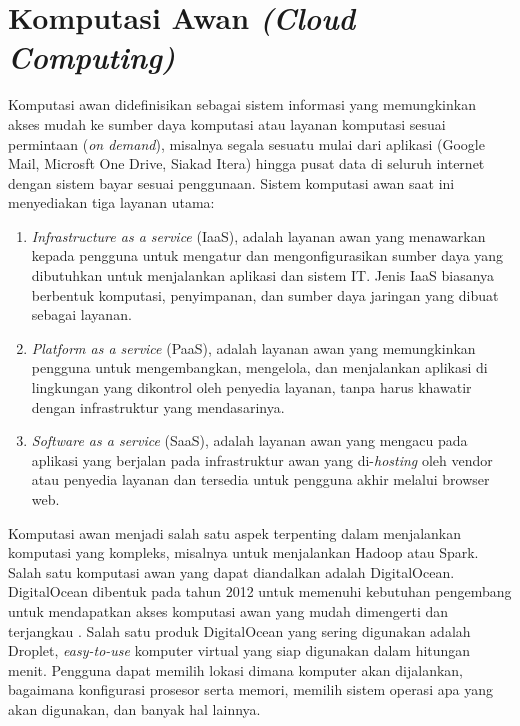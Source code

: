 \section{Komputasi Awan \textit{(Cloud Computing)}}
Komputasi awan didefinisikan sebagai sistem informasi yang memungkinkan akses mudah ke sumber daya komputasi atau layanan komputasi sesuai permintaan (\textit{on demand}), misalnya segala sesuatu mulai dari aplikasi (Google Mail, Microsft One Drive, Siakad Itera) hingga pusat data di seluruh internet dengan sistem bayar sesuai penggunaan.
Sistem komputasi awan saat ini menyediakan tiga layanan utama:
\begin{enumerate}
	\item \textit{Infrastructure as a service} (IaaS), adalah layanan awan yang menawarkan kepada pengguna untuk mengatur dan mengonfigurasikan sumber daya yang dibutuhkan untuk menjalankan aplikasi dan sistem IT. Jenis IaaS biasanya berbentuk komputasi, penyimpanan, dan sumber daya jaringan yang dibuat sebagai layanan.
	\item \textit{Platform as a service} (PaaS), adalah layanan awan yang memungkinkan pengguna untuk mengembangkan, mengelola, dan menjalankan aplikasi di lingkungan yang dikontrol oleh penyedia layanan, tanpa harus khawatir dengan infrastruktur yang mendasarinya. 
	\item \textit{Software as a service} (SaaS), adalah layanan awan yang mengacu pada aplikasi yang berjalan pada infrastruktur awan yang di-\textit{hosting} oleh vendor atau penyedia layanan dan tersedia untuk pengguna akhir melalui browser web. 
\end{enumerate}
Komputasi awan menjadi salah satu aspek terpenting dalam menjalankan komputasi yang kompleks, misalnya untuk menjalankan Hadoop atau Spark. Salah satu komputasi awan yang dapat diandalkan adalah DigitalOcean. DigitalOcean dibentuk pada tahun 2012 untuk memenuhi kebutuhan pengembang untuk mendapatkan akses komputasi awan yang mudah dimengerti dan terjangkau \cite{DigitalOcean}. Salah satu produk DigitalOcean yang sering digunakan adalah Droplet, \textit{easy-to-use} komputer virtual yang siap digunakan dalam hitungan menit. Pengguna dapat memilih lokasi dimana komputer akan dijalankan, bagaimana konfigurasi prosesor serta memori, memilih sistem operasi apa yang akan digunakan, dan banyak hal lainnya.

